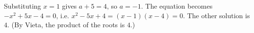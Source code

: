 Substituting $x=1$ gives $a+5=4$, so $a=-1$. The equation becomes $-x^2+5x-4=0$, i.e. $x^2-5x+4=(x-1)(x-4)=0$. The other solution is $\boxed{4}$. (By Vieta, the product of the roots is $4$.)
